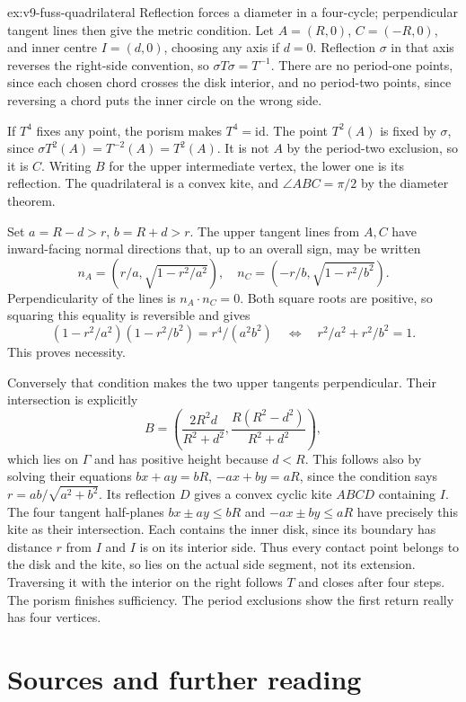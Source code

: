 \begin{solution}{ex:v9-fuss-quadrilateral}
\idea Reflection forces a diameter in a four-cycle; perpendicular tangent lines then give the metric condition.
\writeup Let $A=(R,0)$, $C=(-R,0)$, and inner centre $I=(d,0)$, choosing any axis if $d=0$. Reflection $\sigma$ in that axis reverses the right-side convention, so $\sigma T\sigma=T^{-1}$. There are no period-one points, since each chosen chord crosses the disk interior, and no period-two points, since reversing a chord puts the inner circle on the wrong side.

If $T^4$ fixes any point, the porism makes $T^4=\mathrm{id}$. The point $T^2(A)$ is fixed by $\sigma$, since $\sigma T^2(A)=T^{-2}(A)=T^2(A)$. It is not $A$ by the period-two exclusion, so it is $C$. Writing $B$ for the upper intermediate vertex, the lower one is its reflection. The quadrilateral is a convex kite, and $\angle ABC=\pi/2$ by the diameter theorem.

Set $a=R-d>r$, $b=R+d>r$. The upper tangent lines from $A,C$ have inward-facing normal directions that, up to an overall sign, may be written
\[
n_A=(r/a,\sqrt{1-r^2/a^2}),\quad
n_C=(-r/b,\sqrt{1-r^2/b^2}).
\]
Perpendicularity of the lines is $n_A\cdot n_C=0$. Both square roots are positive, so squaring this equality is reversible and gives
\[
(1-r^2/a^2)(1-r^2/b^2)=r^4/(a^2b^2)
\quad\Longleftrightarrow\quad r^2/a^2+r^2/b^2=1.
\]
This proves necessity.

Conversely that condition makes the two upper tangents perpendicular. Their intersection is explicitly
\[
B=\left(\frac{2R^2d}{R^2+d^2},\frac{R(R^2-d^2)}{R^2+d^2}\right),
\]
which lies on $\Gamma$ and has positive height because $d<R$. This follows also by solving their equations $bx+ay=bR$, $-ax+by=aR$, since the condition says $r=ab/\sqrt{a^2+b^2}$. Its reflection $D$ gives a convex cyclic kite $ABCD$ containing $I$. The four tangent half-planes $bx\pm ay\le bR$ and $-ax\pm by\le aR$ have precisely this kite as their intersection. Each contains the inner disk, since its boundary has distance $r$ from $I$ and $I$ is on its interior side. Thus every contact point belongs to the disk and the kite, so lies on the actual side segment, not its extension. Traversing it with the interior on the right follows $T$ and closes after four steps. The porism finishes sufficiency. The period exclusions show the first return really has four vertices.
\end{solution}

\section*{Sources and further reading}

